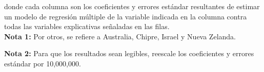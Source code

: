 \documentclass[a4paper, answers, addpoints, 11pt]{exam}
\begin{document}
\begin{itemize}
{\begin{tabular}{l*{8}{c}}
\end{tabular}
} 
  

    \vspace{2mm}
    
    donde cada columna son los coeficientes y errores estándar resultantes de estimar un modelo de regresión múltiple de la variable indicada en la columna contra todas las variables explicativas señaladas en las filas.\\  

\vspace{3mm}      
  \textbf{Nota 1:} Por otros, se refiere a Australia, Chipre, Israel y Nueva Zelanda.\\
  
  \vspace{1mm}
  
  \textbf{Nota 2:} Para que los resultados sean legibles, reescale los coeficientes y errores estándar por 10,000,000.\\
  
  \vspace{1mm}
  

\end{itemize}
\end{document}
